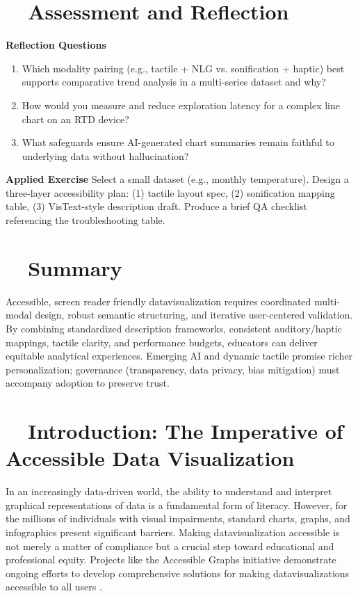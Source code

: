 \section{~~Assessment and Reflection}\label{ch13:sec:assessment-reflection}
\textbf{Reflection Questions}
\begin{enumerate}
	\item Which modality pairing (e.g., tactile + NLG vs. sonification + haptic) best supports comparative trend analysis in a multi-series dataset and why?
	\item How would you measure and reduce exploration latency for a complex line chart on an RTD device?
	\item What safeguards ensure AI-generated chart summaries remain faithful to underlying data without hallucination?
\end{enumerate}
\textbf{Applied Exercise} Select a small dataset (e.g., monthly temperature). Design a three-layer accessibility plan: (1) tactile layout spec, (2) sonification mapping table, (3) VisText-style description draft. Produce a brief QA checklist referencing the troubleshooting table.

\section{~~Summary}\label{ch13:sec:summary}
Accessible, screen reader friendly \gls{datavisualization} requires coordinated multi-modal design, robust semantic structuring, and iterative user-centered validation. By combining standardized description frameworks, consistent auditory/haptic mappings, tactile clarity, and performance budgets, educators can deliver equitable analytical experiences. Emerging AI and dynamic tactile  promise richer personalization; governance (transparency, data privacy, bias mitigation) must accompany adoption to preserve trust.

\section{~~Introduction: The Imperative of Accessible Data Visualization}\label{ch13:sec:introduction}
In an increasingly data-driven world, the ability to understand and interpret graphical representations of data is a fundamental form of literacy. However, for the millions of individuals with visual impairments, standard charts, graphs, and infographics present significant barriers. Making \gls{datavisualization} accessible is not merely a matter of compliance but a crucial step toward educational and professional equity. Projects like the Accessible Graphs initiative demonstrate ongoing efforts to develop comprehensive solutions for making \gls{datavisualization}s accessible to all users \supercite{AccessibleGraphs, AccessVizWorkshop}.

